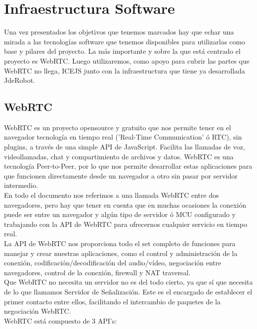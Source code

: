 \chapter{Infraestructura Software} 

Una vez presentados los objetivos que tenemos marcados hay que echar una mirada a las tecnologías software que tenemos disponibles para utilizarlas como base y pilares del proyecto. La más importante y sobre la que está centrado el proyecto es WebRTC. Luego utilizaremos, como apoyo para cubrir las partes que WebRTC no llega, ICEJS junto con la infraestructura que tiene ya desarrollada JdeRobot.


\section{WebRTC}

WebRTC es un proyecto opensource y gratuito que nos permite tener en el navegador tecnología en tiempo real ('Real-Time Communication' ó RTC), sin plugins, a través de una simple API de JavaScript. Facilita las llamadas de voz, videollamadas, chat y compartimiento de archivos y datos. WebRTC es una tecnología Peer-to-Peer, por lo que nos permite desarrollar estas aplicaciones para que funcionen directamente desde un navegador a otro sin pasar por servidor intermedio. \\

En todo el documento nos referimos a una llamada WebRTC entre dos navegadores, pero hay que tener en cuenta que en muchas ocasiones la conexión puede ser entre un navegador y algún tipo de servidor ó MCU configurado y trabajando con la API de WebRTC para ofrecernos cualquier servicio en tiempo real.\\

La API de WebRTC nos proporciona todo el set completo de funciones para manejar y crear nuestras aplicaciones, como el control y administración de la conexión, codificación/decodificación del audio/vídeo, negociación entre navegadores, control de la conexión, firewall y NAT traversal.\\

Que WebRTC no necesita un servidor no es del todo cierto, ya que sí que necesita de lo que llamamos Servidor de Señalización. Este es el encargado de establecer el primer contacto entre ellos, facilitando el intercambio de paquetes de la negociación WebRTC.\\

WebRTC está compuesto de 3 API's:

